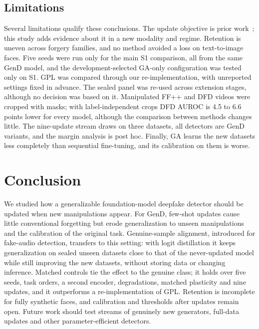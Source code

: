 \documentclass{ieeeaccess}
\newcommand{\ffpp}{FF{+}{+}}
\begin{document}
\subsection{Limitations}
Several limitations qualify these conclusions. The update objective is prior work~\cite{ma2021dfwf}; this study adds evidence about it in a new modality and regime. Retention is uneven across forgery families, and no method avoided a loss on text-to-image faces. Five seeds were run only for the main S1 comparison, all from the same GenD model, and the development-selected GA-only configuration was tested only on S1. GPL was compared through our re-implementation, with unreported settings fixed in advance. The sealed panel was re-used across extension stages, although no decision was based on it. Manipulated \ffpp{} and DFD videos were cropped with masks; with label-independent crops DFD AUROC is 4.5 to 6.6 points lower for every model, although the comparison between methods changes little. The nine-update stream draws on three datasets, all detectors are GenD variants, and the margin analysis is post hoc. Finally, GA learns the new datasets less completely than sequential fine-tuning, and its calibration on them is worse.

\section{Conclusion}

We studied how a generalizable foundation-model deepfake detector should be updated when new manipulations appear. For GenD, few-shot updates cause little conventional forgetting but erode generalization to unseen manipulations and the calibration of the original task. Genuine-sample alignment, introduced for fake-audio detection, transfers to this setting: with logit distillation it keeps generalization on sealed unseen datasets close to that of the never-updated model while still improving the new datasets, without storing data or changing inference. Matched controls tie the effect to the genuine class; it holds over five seeds, task orders, a second encoder, degradations, matched plasticity and nine updates, and it outperforms a re-implementation of GPL. Retention is incomplete for fully synthetic faces, and calibration and thresholds after updates remain open. Future work should test streams of genuinely new generators, full-data updates and other parameter-efficient detectors.



\end{document}
